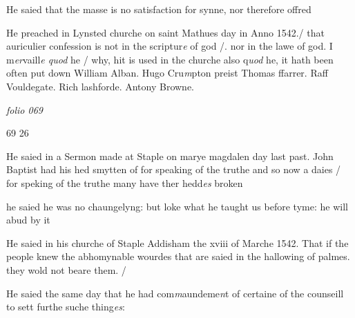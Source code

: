 \documentclass[12pt, a4paper]{book}
\begin{document}
 He saied that the masse is no satisfaction for
 synne, nor therefore offred
 
			
		\ifthenelse{\isodd{\thepage}}
		{\reversemarginpar}
		{\normalmarginpar}
		He preached in Lynsted churche on saint Mathues
 day in Anno 1542./ that auriculier confession is not
 in the scriptur\textit{e} of god /. nor in the lawe of god.
 I m\textit{er}vaill\textit{e quod} he / why, hit is used in the churche
 also q\textit{uod} he, it hath been often put down
 	William Alban. Hugo Cru\textit{m}pton preist Thomas ffarrer.
 	Raff Vouldegate. Rich lashforde. Antony Browne.



\dotfill
					

\textit{folio 069}


\begin{flushright}{\color{Mahogany}69} 26\end{flushright}

	
				\marginpar[\vspace{0.5cm}{\textcolor{Gray}{seditious}}]{}
			
	
		\ifthenelse{\isodd{\thepage}}
		{\reversemarginpar}
		{\normalmarginpar}
		He saied in a Sermon made at Staple on marye
 magdalen day last past. John Baptist had
 his hed smytten of for speaking of the truthe
 and so now a daies / for speking of the truthe
 many have ther hedd\textit{es} broken
	
		\ifthenelse{\isodd{\thepage}}
		{\reversemarginpar}
		{\normalmarginpar}
		he saied he was no chaungelyng: but loke what
 he taught us before tyme: he will abud by it

	
				\marginpar[\vspace{0.5cm}{\textcolor{Gray}{palmes}}]{}
			
	
		\ifthenelse{\isodd{\thepage}}
		{\reversemarginpar}
		{\normalmarginpar}
		He saied in his churche of Staple
			 Addisham the xviii of
 Marche 1542. That if the people knew the
 abhomynable wourdes that are saied in the
 hallowing of palmes. they wold not beare
 them. /
 
				\marginpar[\vspace{0.5cm}{\textcolor{Gray}{sclanderous to me}}]{}
			 
		\ifthenelse{\isodd{\thepage}}
		{\reversemarginpar}
		{\normalmarginpar}
		He saied the same day that he had com\textit{m}aundeme\textit{n}t
 of certaine of the counseill to sett furthe suche
 thing\textit{es}:
 
\end{document}
